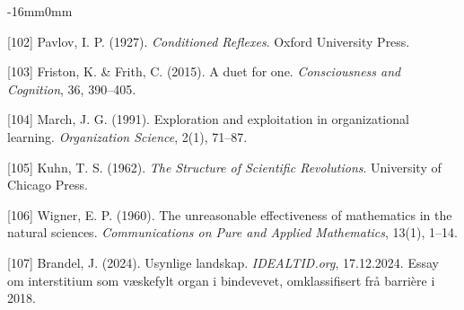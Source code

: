 \documentclass[10pt,oneside]{book}
\newcommand{\refentry}[1]{%
  \par\addvspace{0pt}%
  \begingroup\footnotesize\linespread{0.92}\selectfont
  \noindent\hangindent=4mm\hangafter=1 #1\par%
  \endgroup
}
\newenvironment{widebody}{%
  \begin{adjustwidth}{-16mm}{0mm}%
}{%
  \end{adjustwidth}%
}
\begin{document}
\begin{widebody}
\refentry{[102] Pavlov, I. P. (1927). \textit{Conditioned Reflexes}. Oxford University Press.}
\refentry{[103] Friston, K. \& Frith, C. (2015). A duet for one. \textit{Consciousness and Cognition}, 36, 390--405.}
\refentry{[104] March, J. G. (1991). Exploration and exploitation in organizational learning. \textit{Organization Science}, 2(1), 71--87.}
\refentry{[105] Kuhn, T. S. (1962). \textit{The Structure of Scientific Revolutions}. University of Chicago Press.}
\refentry{[106] Wigner, E. P. (1960). The unreasonable effectiveness of mathematics in the natural sciences. \textit{Communications on Pure and Applied Mathematics}, 13(1), 1--14.}
\refentry{[107] Brandel, J. (2024). Usynlige landskap. \textit{IDEALTID.org}, 17.12.2024. Essay om interstitium som væskefylt organ i bindevevet, omklassifisert frå barrière i 2018.}
\end{widebody}
\end{document}
